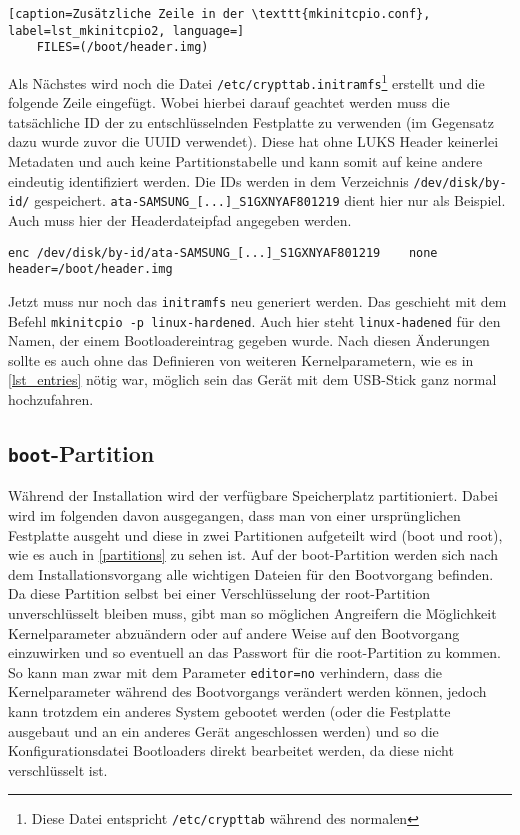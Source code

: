 \begin{lstlisting}[caption=Zusätzliche Zeile in der \texttt{mkinitcpio.conf}, label=lst_mkinitcpio2, language=]
	FILES=(/boot/header.img)
\end{lstlisting}

Als Nächstes wird noch die Datei \texttt{/etc/crypttab.initramfs}\footnote{Diese Datei entspricht \texttt{/etc/crypttab} während des normalen } erstellt und die folgende Zeile eingefügt. Wobei hierbei darauf geachtet werden muss die tatsächliche ID der zu entschlüsselnden Festplatte zu verwenden {\small(im Gegensatz dazu wurde zuvor die UUID verwendet)}. Diese hat ohne \ac{LUKS} Header keinerlei Metadaten und auch keine Partitionstabelle und kann somit auf keine andere eindeutig identifiziert werden.\cite{DmcryptSpecialtiesArchWiki} Die IDs werden in dem Verzeichnis \texttt{/dev/disk/by-id/} gespeichert. \texttt{ata-SAMSUNG\_[...]\_S1GXNYAF801219} dient hier nur als Beispiel. Auch muss hier der Headerdateipfad angegeben werden.

\begin{lstlisting}[caption=\texttt{crypttab.initramfs}, label=lst_crypttab.initramfs]
	enc	/dev/disk/by-id/ata-SAMSUNG_[...]_S1GXNYAF801219	none	header=/boot/header.img
\end{lstlisting}

Jetzt muss nur noch das \texttt{initramfs} neu generiert werden. Das geschieht mit dem Befehl \texttt{mkinitcpio -p linux-hardened}. Auch hier steht \texttt{linux-hadened} für den Namen, der einem Bootloadereintrag gegeben wurde. Nach diesen Änderungen sollte es auch ohne das Definieren von weiteren Kernelparametern, wie es in \autoref{lst_entries} nötig war, möglich sein das Gerät mit dem USB-Stick ganz normal hochzufahren.\cite{DmcryptSpecialtiesArchWiki}

\subsection{\texttt{boot}-Partition}\label{sec:boot}
Während der Installation wird der verfügbare Speicherplatz partitioniert. Dabei wird im folgenden davon ausgegangen, dass man von einer ursprünglichen Festplatte ausgeht und diese in zwei Partitionen aufgeteilt wird {\small(boot und root)}, wie es auch in \autoref{partitions} zu sehen ist. Auf der boot-Partition werden sich nach dem Installationsvorgang alle wichtigen Dateien für den Bootvorgang befinden. Da diese Partition selbst bei einer Verschlüsselung der root-Partition unverschlüsselt bleiben muss, gibt man so möglichen Angreifern die Möglichkeit Kernelparameter abzuändern oder auf andere Weise auf den Bootvorgang einzuwirken und so eventuell an das Passwort für die root-Partition zu kommen. So kann man zwar mit dem Parameter \texttt{editor=no} verhindern, dass die Kernelparameter während des Bootvorgangs verändert werden können, jedoch kann trotzdem ein anderes System gebootet werden {\small(oder die Festplatte ausgebaut und an ein anderes Gerät angeschlossen werden)} und so die Konfigurationsdatei Bootloaders direkt bearbeitet werden, da diese nicht verschlüsselt ist.\cite{SystemdbootArchWiki}

